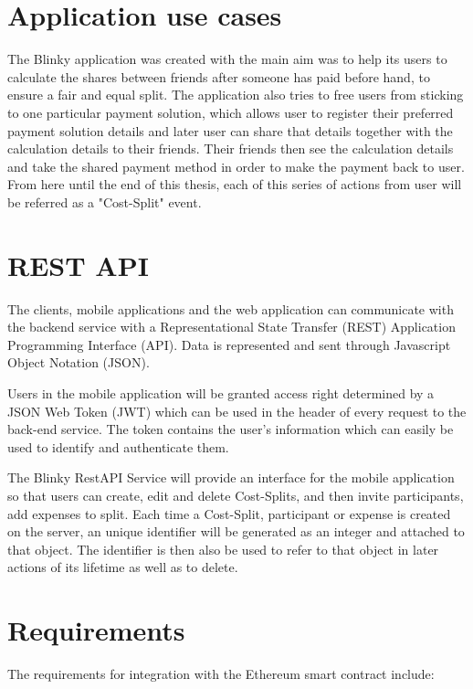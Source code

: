 \documentclass[twoside,numperchapter]{tutthesis} %
\begin{document}
\section{Application use cases}

The Blinky application was created with the main aim was to help its users to calculate the shares between friends after someone has paid before hand, to ensure a fair and equal split. The application also tries to free users from sticking to one particular payment solution, which allows user to register their preferred payment solution details and later user can share that details together with the calculation details to their friends. Their friends then see the calculation details and take the shared payment method in order to make the payment back to user. From here until the end of this thesis, each of this series of actions from user will be referred as a "Cost-Split" event.

\section{REST API}

The clients, mobile applications and the web application  can communicate with the backend service with a Representational State Transfer (REST)  \citep{REST} Application Programming Interface (API). Data is represented and sent through Javascript Object Notation (JSON).

Users in the mobile application will be granted access right determined by a JSON Web Token (JWT) which can be used in the header of every request to the back-end service. The token contains the user's information which  can easily be used to identify and authenticate them.

The Blinky RestAPI Service will provide an interface for the mobile application so that users can create, edit and delete Cost-Splits, and then invite participants, add expenses to split. Each time a Cost-Split, participant or expense is created on the server, an unique identifier will be generated as an integer and attached to that object. The identifier is then also be used to refer to that object in later actions of its lifetime as well as to delete.
\label{blinkyAPI}

\section{Requirements}
\label{section:requirements}

The requirements for integration with the Ethereum smart contract include:
\end{document}
